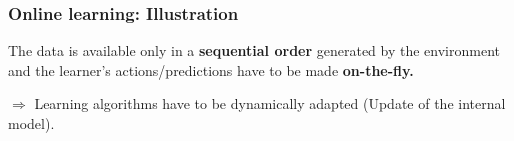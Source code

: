 \begin{frame}
\frametitle{Online learning: Illustration}
\small
%	
{ The data is available only in a \textbf{sequential order} generated by the environment and the learner's actions/predictions have to be made \textbf{on-the-fly.}}
%

{ {$\Rightarrow $ Learning algorithms have to be dynamically adapted (Update of the internal model).\\~} }
 
{}
{}
{}

\end{frame}
